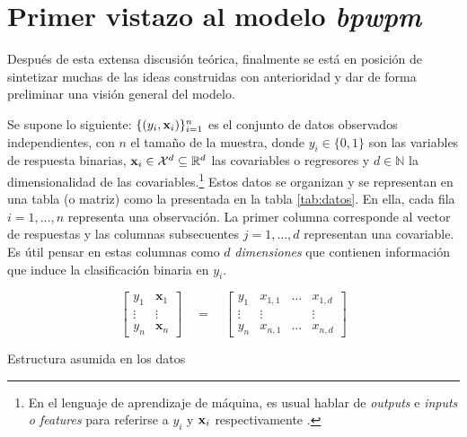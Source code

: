 \documentclass[../Main/Main.tex]{subfiles}
\begin{document}

\section{Primer vistazo al modelo \textit{bpwpm}} \label{sec:PrimerVistazo}
Después de esta extensa discusión teórica, finalmente se está en posición de sintetizar muchas de las ideas construidas con anterioridad y dar de forma preliminar una visión general del modelo.

Se supone lo siguiente: $\{(y_i,\mathbf{x}_i)\}_{i = 1}^n$ es el conjunto de datos observados independientes, con $n$ el tamaño de la muestra, donde $y_i \in \{0,1\}$ son las variables de respuesta binarias, $\mathbf{x}_i \in \mathcal{X}^d \subseteq \mathbb{R}^d$ las covariables o regresores y $d \in \mathbb{N}$ la dimensionalidad de las covariables.\footnote{En el lenguaje de aprendizaje de máquina, es usual hablar de \textit{outputs} e \textit{inputs o features} para referirse a $y_i$ y $\mathbf{x}_i$ respectivamente \autocite{alpaydin2014introduction}.} Estos datos se organizan y se representan en una tabla (o matriz) como la presentada en la tabla \ref{tab:datos}. En ella, cada fila $i = 1,\ldots,n$ representa una observación. La primer columna corresponde al vector de respuestas y las columnas subsecuentes $j = 1,\ldots,d$ representan una covariable. Es útil pensar en estas columnas como $d$ \textit{dimensiones} que contienen información que induce la clasificación binaria en $y_i$.

\begin{table}[h]
$$
\left[\begin{array}{c|c} 
y_1 & \mathbf{x}_1 \\ 
\vdots & \vdots \\ 
y_n & \mathbf{x}_n \end{array}\right] 
\quad = \quad
\left[\begin{array}{c|ccc} 
y_1 & x_{1,1} & \ldots & x_{1,d} \\ 
\vdots & \vdots & ~ & \vdots \\ 
y_n & x_{n,1} & \ldots & x_{n,d}
\end{array}\right]
$$
\caption{Estructura asumida en los datos}
\label{tab:datos}
\end{table}
\end{document}
